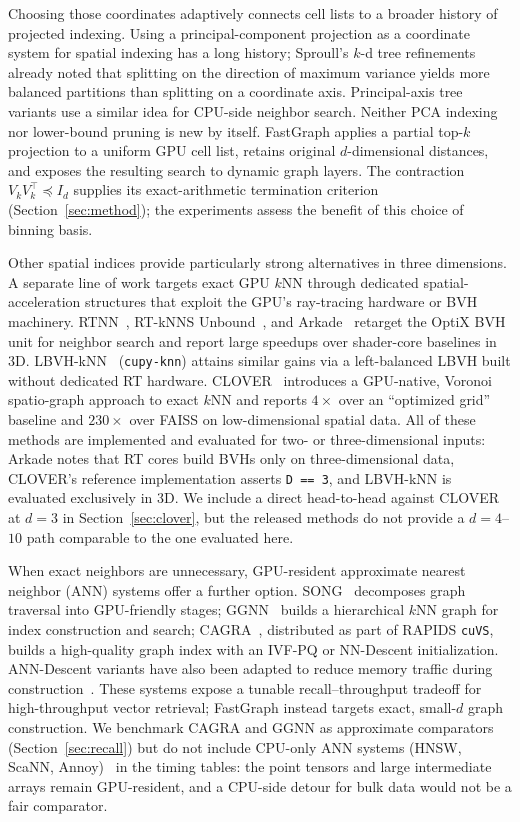 \documentclass[final,3p,11pt]{elsarticle}
\begin{document}
Choosing those coordinates adaptively connects cell lists to a broader
history of projected indexing. Using a principal-component projection as a coordinate system for
spatial indexing has a long history; Sproull's $k$-d tree
refinements~\cite{sproull1991refinements} already noted that
splitting on the direction of maximum variance yields more balanced
partitions than splitting on a coordinate axis. Principal-axis tree
variants use a similar idea for CPU-side neighbor search. Neither PCA
indexing nor lower-bound pruning is new by itself. FastGraph applies a
partial top-$k$ projection to a uniform GPU cell list, retains original
$d$-dimensional distances, and exposes the resulting search to dynamic
graph layers. The contraction $V_k V_k^\top \preceq I_d$ supplies its
exact-arithmetic termination criterion (Section~\ref{sec:method}); the
experiments assess the benefit of this choice of binning basis.

Other spatial indices provide particularly strong alternatives in
three dimensions. A separate line of work targets exact GPU $k$NN through dedicated
spatial-acceleration structures that exploit the GPU's
ray-tracing hardware or BVH machinery. RTNN~\cite{wald2019rtnn},
RT-kNNS Unbound~\cite{evangelou2021rtknn}, and
Arkade~\cite{nagarajan2023arkade} retarget the OptiX BVH unit for
neighbor search and report large speedups over shader-core baselines
in 3D. LBVH-kNN~\cite{jakob2021optimized} (\texttt{cupy-knn}) attains
similar gains via a left-balanced LBVH built without dedicated
RT hardware. CLOVER~\cite{kamel2025clover} introduces a GPU-native,
Voronoi spatio-graph approach to exact $k$NN and reports
$4\times$ over an ``optimized grid'' baseline and
$230\times$ over FAISS on low-dimensional spatial data. All of these methods are
implemented and evaluated for two- or three-dimensional inputs: Arkade
notes that RT cores build BVHs only on three-dimensional data, CLOVER's
reference implementation asserts \texttt{D == 3}, and LBVH-kNN is
evaluated exclusively in 3D. We include a direct head-to-head against
CLOVER at $d{=}3$ in Section~\ref{sec:clover}, but the released methods
do not provide a $d{=}4$--$10$ path comparable to the one evaluated here.

When exact neighbors are unnecessary, GPU-resident approximate nearest
neighbor (ANN) systems offer a further option. SONG~\cite{zhao2020song} decomposes graph
traversal into GPU-friendly stages; GGNN~\cite{ggnn} builds a
hierarchical $k$NN graph for index construction and search;
CAGRA~\cite{ootomo2023cagra}, distributed as part of RAPIDS
\texttt{cuVS}, builds a high-quality graph index with an IVF-PQ or
NN-Descent initialization. ANN-Descent variants have also been adapted
to reduce memory traffic during construction~\cite{wang2021large}.
These systems expose a tunable recall--throughput tradeoff for
high-throughput vector retrieval; FastGraph instead targets exact,
small-$d$ graph construction. We benchmark CAGRA and GGNN as approximate
comparators (Section~\ref{sec:recall}) but do not include CPU-only ANN
systems (HNSW, ScaNN, Annoy)~\cite{malkov2020hnsw,guo2020scann,bernhardsson2013annoy}
in the timing tables: the point tensors and large intermediate arrays remain
GPU-resident, and a CPU-side detour for bulk data would not be a fair comparator.
\end{document}
